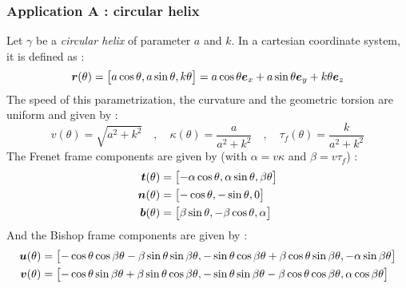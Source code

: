 \subsubsection{Application A : circular helix}
Let $\gamma$ be a \emph{circular helix} of parameter $a$ and $k$. In a cartesian coordinate system, it is defined as :
\begin{equation}
	\boldsymbol{r}(\theta) 
	=
	\begin{bmatrix}
		a \cos \theta, a \sin \theta, k \theta
	\end{bmatrix}
	= a \cos \theta \boldsymbol{e}_x + a \sin \theta \boldsymbol{e}_y + k \theta \boldsymbol{e}_z
\end{equation}
The speed of this parametrization, the curvature and the geometric torsion are uniform and given by :
\begin{equation}
	v(\theta) = \sqrt{a^2+k^2}
	\quad,\quad
	\kappa(\theta) = \frac{a}{a^2 + k^2}
	\quad,\quad
	\tau_f(\theta) = \frac{k}{a^2 + k^2}
\end{equation}
The Frenet frame components are given by (with $\alpha = v \kappa$ and $\beta = v \tau_f$) :
\begin{equation}
	\begin{aligned}
	\boldsymbol{t}(\theta) &=
		\begin{bmatrix} 
			- \alpha \cos \theta, \alpha \sin \theta, \beta \theta 
		\end{bmatrix}
	\\
	\boldsymbol{n}(\theta) &= 
		\begin{bmatrix} 
			-\cos \theta, -\sin \theta, 0 
		\end{bmatrix}
	\\
	\boldsymbol{b}(\theta) &=
		\begin{bmatrix} 
			\beta \sin \theta, - \beta \cos \theta, \alpha
	\end{bmatrix} 	
	\end{aligned}
\end{equation}
And the Bishop frame components are given by :
\begin{equation}
	\begin{aligned}
		\boldsymbol{u}(\theta) &= 
		\begin{bmatrix} 	
			-\cos \theta \cos \beta \theta - \beta  \sin \theta \sin \beta \theta, -\sin \theta \cos \beta \theta + \beta  \cos \theta \sin \beta \theta, - \alpha \sin \beta \theta
		\end{bmatrix}
		\\
		\boldsymbol{v}(\theta) &= 
		\begin{bmatrix} 
			-\cos \theta \sin \beta \theta + \beta  \sin \theta \cos \beta \theta, -\sin \theta \sin \beta \theta - \beta  \cos \theta \cos \beta \theta, \alpha \cos \beta \theta
		\end{bmatrix}
	\end{aligned}
\end{equation}





